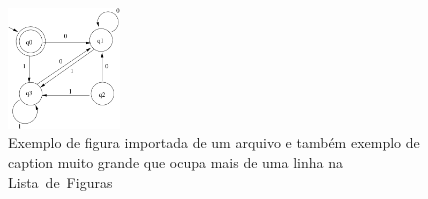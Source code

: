 \documentclass[cic,tc,english]{iiufrgs}
\begin{document}
\begin{figure}
    \caption{Exemplo de figura importada de um arquivo e também exemplo de caption muito grande que ocupa mais de uma linha na Lista~de~Figuras}
    \begin{center}
        \includegraphics[width=8em]{fig}
    \end{center}
    \label{fig:ex1}
\end{figure}



\end{document}
